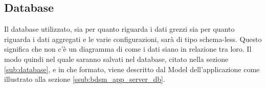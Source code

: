 %


\subsection{Database} %
\label{sec:database}
Il database utilizzato, sia per quanto riguarda i dati grezzi sia per quanto riguarda i dati aggregati e le varie configurazioni, sarà di tipo schema-less. Questo significa che non c'è un diagramma di come i dati siano in relazione tra loro. \newline
Il modo quindi nel quale saranno salvati nel database, citato nella sezione \ref{sub:database}, e in che formato, viene descritto dal Model dell'applicazione come illustrato alla sezione \ref{ssub:bdsm_app_server_db}.

